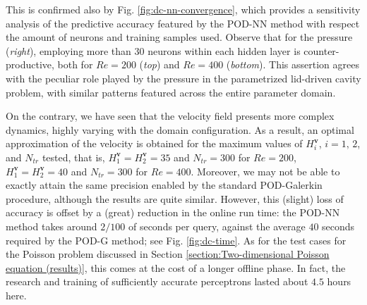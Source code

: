 \documentclass[12pt, a4paper, twoside, openright, notitlepage]{report}
\numberwithin{equation}{chapter}
\theoremstyle{theorem}
\theoremstyle{definition}
\theoremstyle{remark}
\theoremstyle{proposition}
\numberwithin{figure}{chapter}
\newcommand{\bg}[1]{\boldsymbol{#1}}
\begin{document}
		This is confirmed also by Fig. \ref{fig:dc-nn-convergence}, which provides a sensitivity analysis of the predictive accuracy featured by the POD-NN method with respect the amount of neurons and training samples used. Observe that for the pressure (\emph{right}), employing more than $30$ neurons within each hidden layer is counter-productive, both for $Re = 200$ (\emph{top}) and $Re = 400$ (\emph{bottom}). This assertion agrees with the peculiar role played by the pressure in the parametrized lid-driven cavity problem, with similar patterns featured across the entire parameter domain. 
		
		On the contrary, we have seen that the velocity field presents more complex dynamics, highly varying with the domain configuration. As a result, an optimal approximation of the velocity is obtained for the maximum values of $H_i^{\bg{v}}$, $i = 1, \, 2$, and $N_{tr}$ tested, that is, $H_1^{\bg{v}} = H_2^{\bg{v}} = 35$ and $N_{tr} = 300$ for $Re = 200$, $H_1^{\bg{v}} = H_2^{\bg{v}} = 40$ and $N_{tr} = 300$ for $Re = 400$. Moreover, we may not be able to exactly attain the same precision enabled by the standard POD-Galerkin procedure, although the results are quite similar. However, this (slight) loss of accuracy is offset by a (great) reduction in the online run time: the POD-NN method takes around $2/100$ of seconds per query, against the average $40$ seconds required by the POD-G method; see Fig. \ref{fig:dc-time}. As for the test cases for the Poisson problem discussed in Section \ref{section:Two-dimensional Poisson equation (results)}, this comes at the cost of a longer offline phase. In fact, the research and training of sufficiently accurate perceptrons lasted about $4.5$ hours here.
		
		\clearpage
		
		\vspace*{-1.4cm}
						
\end{document}
